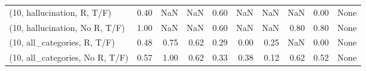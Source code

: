\begin{table*}[h!]
\begin{adjustbox}{width=2\columnwidth,center}
\begin{tabular}{lrrr|rrr|rrr}
(10, hallucination, R, T/F)           &                      0.40 &                   NaN &                       NaN &                          0.60 &                       NaN &                           NaN &                                    NaN &                               0.00 &                                  None \\
(10, hallucination, No R, T/F)        &                      1.00 &                   NaN &                       NaN &                          0.60 &                       NaN &                           NaN &                                   0.80 &                               0.80 &                                  None \\
(10, all\_categories, R, T/F)          &                      0.48 &                  0.75 &                      0.62 &                          0.29 &                      0.00 &                          0.25 &                                    NaN &                               0.00 &                                  None \\
(10, all\_categories, No R, T/F)       &                      0.57 &                  1.00 &                      0.62 &                          0.33 &                      0.38 &                          0.12 &                                   0.62 &                               0.52 &                                  None \\




\end{tabular}
\end{adjustbox}
\end{table*}
